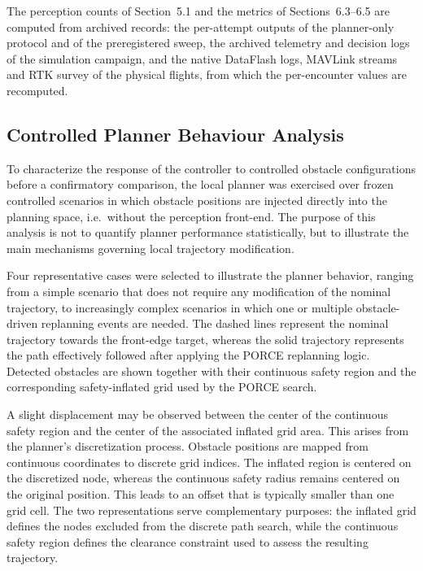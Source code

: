 \documentclass[electronics,article,submit,moreauthors]{Definitions/mdpi}
\DeclareRobustCommand{\added}[1]{#1}%
\DeclareRobustCommand{\added}[1]{\textcolor{green!50!black}{#1}}
\def\added#1{#1}%
\begin{document}
\added{The perception counts of Section~5.1 and the metrics of Sections~6.3--6.5 are computed from archived records: the per-attempt outputs of the planner-only protocol and of the preregistered sweep, the archived telemetry and decision logs of the simulation campaign, and the native DataFlash logs, MAVLink streams and RTK survey of the physical flights, from which the per-encounter values are recomputed.}

\subsection{\added{Controlled Planner Behaviour Analysis}}

\added{To characterize the response of the controller to controlled obstacle configurations before a confirmatory comparison, the local planner was exercised over frozen controlled scenarios in which obstacle positions are injected directly into the planning space, i.e.\ without the perception front-end. The purpose of this analysis is not to quantify planner performance statistically, but to illustrate the main mechanisms governing local trajectory modification.}

\added{Four representative cases were selected to illustrate the planner behavior, ranging from a simple scenario that does not require any modification of the nominal trajectory, to increasingly complex scenarios in which one or multiple obstacle-driven replanning events are needed. 
The dashed lines represent the nominal trajectory towards the front-edge target, whereas the solid trajectory represents the path effectively followed after applying the PORCE replanning logic. Detected obstacles are shown together with their continuous safety region and the corresponding safety-inflated grid used by the PORCE search.}

\added{A slight displacement may be observed between the center of the continuous safety region and the center of the associated inflated grid area. This arises from the planner’s discretization process. Obstacle positions are mapped from continuous coordinates to discrete grid indices. The inflated region is centered on the discretized node, whereas the continuous safety radius remains centered on the original position. This leads to an offset that is typically smaller than one grid cell. The two representations serve complementary purposes: the inflated grid defines the nodes excluded from the discrete path search, while the continuous safety region defines the clearance constraint used to assess the resulting trajectory.}
\end{document}
